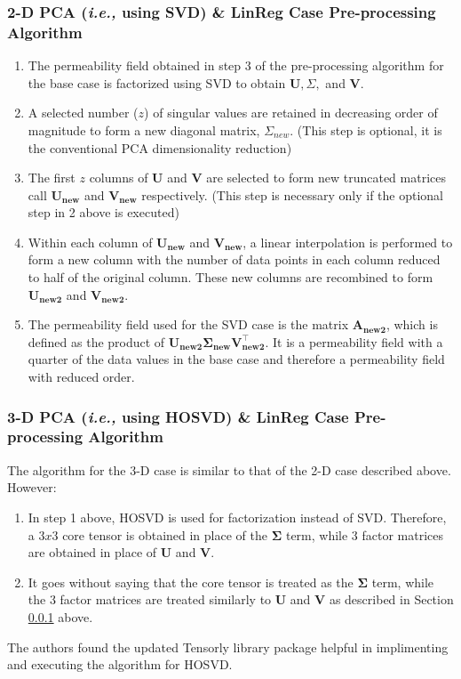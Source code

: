 \documentclass[preprint,12pt]{elsarticle}
\newcommand{\ie}{{\it i.e., }}
\begin{document}
\subsubsection{2-D PCA (\ie{using SVD}) \& LinReg Case Pre-processing Algorithm}\label{subsubsection:svdcase_preprocess_algorithm}
\begin{enumerate}[1.]
  \item The permeability field obtained in step 3 of the pre-processing algorithm for the base case is factorized using SVD to obtain $\mathbf{U}, \Sigma,$ and $\mathbf{V}$.
  \item A selected number ($z$) of singular values are retained in decreasing order of magnitude to form a new diagonal matrix, $\Sigma_{new}$. (This step is optional, it is the conventional PCA dimensionality reduction)
  \item The first $z$ columns of $\mathbf{U}$ and $\mathbf{V}$ are selected to form new truncated matrices call $\mathbf{U_{new}}$ and $\mathbf{V_{new}}$ respectively. (This step is necessary only if the optional step in 2 above is executed)
  \item Within each column of $\mathbf{U_{new}}$ and $\mathbf{V_{new}}$, a linear interpolation is performed to form a new column with the number of data points in each column reduced to half of the original column. These new columns are recombined to form $\mathbf{U_{new2}}$ and $\mathbf{V_{new2}}$.
  \item The permeability field used for the SVD case is the matrix $\mathbf{A_{new2}}$, which is defined as the product of $\mathbf{U_{new2}} \mathbf{\Sigma_{new}} \mathbf{V_{new2}^{\intercal}}$. It is a permeability field with a quarter of the data values in the base case and therefore a permeability field with reduced order.  
\end{enumerate}


\subsubsection{3-D PCA (\ie{using HOSVD}) \& LinReg Case Pre-processing Algorithm}\label{subsubsection:hosvdcase_preprocess_algorithm}
The algorithm for the 3-D case is similar to that of the 2-D case described above. However:
\begin{enumerate}[1.]
\item In step 1 above, HOSVD is used for factorization instead of SVD. Therefore, a $3 x 3$ core tensor is obtained in place of the $\mathbf{\Sigma}$ term, while 3 factor matrices are obtained in place of $\mathbf{U}$ and $\mathbf{V}$.
  \item It goes without saying that the core tensor is treated as the $\mathbf{\Sigma}$ term, while the 3 factor matrices are treated similarly to $\mathbf{U}$ and $\mathbf{V}$ as described in Section \ref{subsubsection:svdcase_preprocess_algorithm} above.
\end{enumerate}
The authors found the updated Tensorly library package \cite{Tensorly_2018} helpful in implimenting and executing the algorithm for HOSVD.
\end{document}

